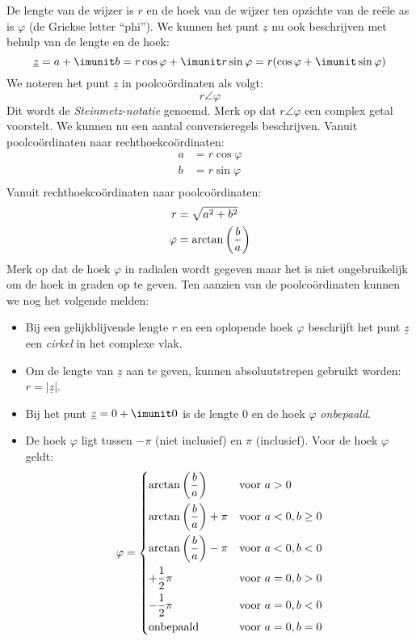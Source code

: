 De lengte van de wijzer is $r$ en de hoek van de wijzer ten opzichte van de reële as is $\varphi$ (de Griekse letter ``phi''). We kunnen het punt $\underline{z}$ nu ook beschrijven met behulp van de lengte en de hoek:
%
\begin{equation}
\underline{z} = a + \imunit b = r\cos\varphi + \imunit r\sin\varphi = r(\cos\varphi + \imunit\sin\varphi)
\end{equation}
%
We noteren het punt $\underline{z}$ in poolcoördinaten als volgt:
\begin{equation}
r\angle\varphi
\end{equation}
%
Dit wordt de \textsl{Steinmetz-notatie} genoemd. Merk op dat $r\angle\varphi$ een complex getal voorstelt.
We kunnen nu een aantal conversieregels beschrijven. Vanuit poolcoördinaten naar rechthoekcoördinaten:
%
\begin{equation}
\begin{split}
a &= r\cos\varphi \\
b &= r\sin\varphi \\
\end{split}
\end{equation}
Vanuit rechthoekcoördinaten naar poolcoördinaten:
\begin{equation}
\begin{split}
r       &= \sqrt{\mathstrut a^2 + b ^2} \\
\varphi &= \arctan\left(\dfrac{b}{a}\right)
\end{split}
\end{equation}
%
Merk op dat de hoek $\varphi$ in radialen wordt gegeven maar het is niet ongebruikelijk om de hoek in graden op te geven.
Ten aanzien van de poolcoördinaten kunnen we nog het volgende melden:
\begin{itemize}
\item Bij een gelijkblijvende lengte $r$ en een oplopende hoek $\varphi$ beschrijft het punt $\underline{z}$ een \textsl{cirkel} in het complexe vlak.
\item Om de lengte van $\underline{z}$ aan te geven, kunnen absoluutstrepen gebruikt worden: $r=|\underline{z}|$.
\item Bij het punt $\underline{z} = 0 + \imunit0$ is de lengte 0 en de hoek $\varphi$ \textsl{onbepaald}.
\item De hoek $\varphi$ ligt tussen $-\pi$ (niet inclusief) en $\pi$ (inclusief). Voor de hoek $\varphi$ geldt:
\begin{equation}
\varphi = \begin{dcases}
\arctan\left(\frac{b}{a}\right)       & \text{voor } a>0 \\
\arctan\left(\frac{b}{a}\right) + \pi & \text{voor } a<0, b \geq 0 \\
\arctan\left(\frac{b}{a}\right) - \pi & \text{voor } a<0, b < 0 \\
+\dfrac{1}{2}\pi                      & \text{voor } a=0, b > 0 \\
-\dfrac{1}{2}\pi                      & \text{voor } a=0, b < 0 \\
\text{onbepaald}                      & \text{voor } a=0, b = 0
\end{dcases}
\end{equation}
\end{itemize}


